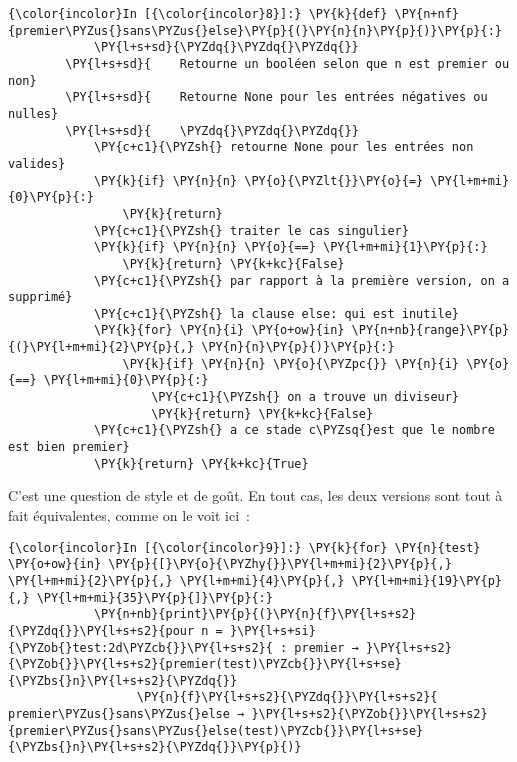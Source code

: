     \begin{Verbatim}[commandchars=\\\{\}]
{\color{incolor}In [{\color{incolor}8}]:} \PY{k}{def} \PY{n+nf}{premier\PYZus{}sans\PYZus{}else}\PY{p}{(}\PY{n}{n}\PY{p}{)}\PY{p}{:}
            \PY{l+s+sd}{\PYZdq{}\PYZdq{}\PYZdq{}}
        \PY{l+s+sd}{    Retourne un booléen selon que n est premier ou non}
        \PY{l+s+sd}{    Retourne None pour les entrées négatives ou nulles}
        \PY{l+s+sd}{    \PYZdq{}\PYZdq{}\PYZdq{}}
            \PY{c+c1}{\PYZsh{} retourne None pour les entrées non valides}
            \PY{k}{if} \PY{n}{n} \PY{o}{\PYZlt{}}\PY{o}{=} \PY{l+m+mi}{0}\PY{p}{:}
                \PY{k}{return}
            \PY{c+c1}{\PYZsh{} traiter le cas singulier}
            \PY{k}{if} \PY{n}{n} \PY{o}{==} \PY{l+m+mi}{1}\PY{p}{:}
                \PY{k}{return} \PY{k+kc}{False}
            \PY{c+c1}{\PYZsh{} par rapport à la première version, on a supprimé}
            \PY{c+c1}{\PYZsh{} la clause else: qui est inutile}
            \PY{k}{for} \PY{n}{i} \PY{o+ow}{in} \PY{n+nb}{range}\PY{p}{(}\PY{l+m+mi}{2}\PY{p}{,} \PY{n}{n}\PY{p}{)}\PY{p}{:}
                \PY{k}{if} \PY{n}{n} \PY{o}{\PYZpc{}} \PY{n}{i} \PY{o}{==} \PY{l+m+mi}{0}\PY{p}{:}
                    \PY{c+c1}{\PYZsh{} on a trouve un diviseur}
                    \PY{k}{return} \PY{k+kc}{False}
            \PY{c+c1}{\PYZsh{} a ce stade c\PYZsq{}est que le nombre est bien premier}
            \PY{k}{return} \PY{k+kc}{True}
\end{Verbatim}


    C'est une question de style et de goût. En tout cas, les deux versions
sont tout à fait équivalentes, comme on le voit ici~:

    \begin{Verbatim}[commandchars=\\\{\}]
{\color{incolor}In [{\color{incolor}9}]:} \PY{k}{for} \PY{n}{test} \PY{o+ow}{in} \PY{p}{[}\PY{o}{\PYZhy{}}\PY{l+m+mi}{2}\PY{p}{,} \PY{l+m+mi}{2}\PY{p}{,} \PY{l+m+mi}{4}\PY{p}{,} \PY{l+m+mi}{19}\PY{p}{,} \PY{l+m+mi}{35}\PY{p}{]}\PY{p}{:}
            \PY{n+nb}{print}\PY{p}{(}\PY{n}{f}\PY{l+s+s2}{\PYZdq{}}\PY{l+s+s2}{pour n = }\PY{l+s+si}{\PYZob{}test:2d\PYZcb{}}\PY{l+s+s2}{ : premier → }\PY{l+s+s2}{\PYZob{}}\PY{l+s+s2}{premier(test)\PYZcb{}}\PY{l+s+se}{\PYZbs{}n}\PY{l+s+s2}{\PYZdq{}}
                  \PY{n}{f}\PY{l+s+s2}{\PYZdq{}}\PY{l+s+s2}{    premier\PYZus{}sans\PYZus{}else → }\PY{l+s+s2}{\PYZob{}}\PY{l+s+s2}{premier\PYZus{}sans\PYZus{}else(test)\PYZcb{}}\PY{l+s+se}{\PYZbs{}n}\PY{l+s+s2}{\PYZdq{}}\PY{p}{)}
\end{Verbatim}



